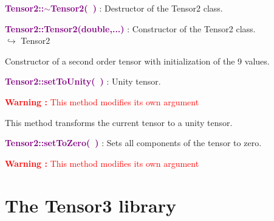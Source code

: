 
\textcolor{purple}{\textbf{Tensor2::$\sim$Tensor2(~)}}\label{Tensor2::~Tensor2()} : Destructor of the Tensor2 class.


\textcolor{purple}{\textbf{Tensor2::Tensor2(double,...)}}\label{Tensor2::Tensor2(double,...)} : Constructor of the Tensor2 class.\\ \hspace*{5mm}$\hookrightarrow$ Tensor2

Constructor of a second order tensor with initialization of the 9 values.

\textcolor{purple}{\textbf{Tensor2::setToUnity(~)}}\label{Tensor2::setToUnity()} : Unity tensor.

\hspace*{10mm}\textcolor{red}{\textbf{Warning :} This method modifies its own argument}

This method transforms the current tensor to a unity tensor.

\textcolor{purple}{\textbf{Tensor2::setToZero(~)}}\label{Tensor2::setToZero()} : Sets all components of the tensor to zero.

\hspace*{10mm}\textcolor{red}{\textbf{Warning :} This method modifies its own argument}


\section{The Tensor3 library}

